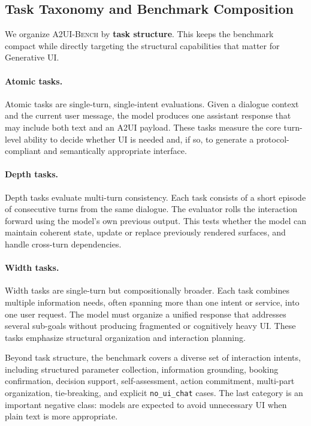 \documentclass{llmxive}
\begin{document}
\subsection{Task Taxonomy and Benchmark Composition}
\label{subsec:bench-taxonomy}

We organize \textsc{A2UI-Bench} by \textbf{task structure}. This keeps the benchmark compact while directly targeting the structural capabilities that matter for Generative UI.

\paragraph{Atomic tasks.}
Atomic tasks are single-turn, single-intent evaluations. Given a dialogue context and the current user message, the model produces one assistant response that may include both text and an A2UI payload. These tasks measure the core turn-level ability to decide whether UI is needed and, if so, to generate a protocol-compliant and semantically appropriate interface.

\paragraph{Depth tasks.}
Depth tasks evaluate multi-turn consistency. Each task consists of a short episode of consecutive turns from the same dialogue. The evaluator rolls the interaction forward using the model's own previous output. This tests whether the model can maintain coherent state, update or replace previously rendered surfaces, and handle cross-turn dependencies.

\paragraph{Width tasks.}
Width tasks are single-turn but compositionally broader. Each task combines multiple information needs, often spanning more than one intent or service, into one user request. The model must organize a unified response that addresses several sub-goals without producing fragmented or cognitively heavy UI. These tasks emphasize structural organization and interaction planning.

Beyond task structure, the benchmark covers a diverse set of interaction intents, including structured parameter collection, information grounding, booking confirmation, decision support, self-assessment, action commitment, multi-part organization, tie-breaking, and explicit \texttt{no\_ui\_chat} cases. The last category is an important negative class: models are expected to avoid unnecessary UI when plain text is more appropriate.
\end{document}
